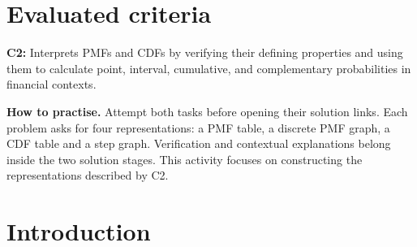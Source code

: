 \newcommand{\cTwoConnectionReading}{%
\textbf{How to read the stacked graphs.} The top graph shows the CDF and pale
dashed PMF shadows; the bottom graph shows the original blue PMF stems.
The plotting areas have identical horizontal limits, support ticks, numerical
spacing, widths and vertical scales. Stems show isolated masses, not positive
probability at every point along a segment. Each shadow represents a jump size:
it translates the mass vertically from $0$ to $\cTwoCDFHL{F_X(a^-)}$, keeping
its horizontal coordinate and physical length. Its top is $\cTwoCDFHL{F_X(a)}$, so
$\cTwoCDFHL{F_X(a)}-\cTwoCDFHL{F_X(a^-)}=\cTwoMassHL{p_X(a)}$.
Thin upward, parabolically curved arrows show correspondence from each bottom stem's midpoint
$(a,p_X(a)/2)$ to its top shadow's midpoint $(a,F_X(a^-)+p_X(a)/2)$,
including the smallest support value, where $F_X(a^-)=0$.
Their curved paths indicate correspondence, not additional probability values.
Shadows are neither extra masses nor extra CDF values at the cutoff.
CDF filled points give the included values; open points exclude the lower
heights. Pale shadow top dots sit behind the CDF endpoint markers.}


\maketitle
\section*{Evaluated criteria}
\textbf{C2:} Interprets PMFs and CDFs by verifying their defining properties and using them to calculate point, interval, cumulative, and complementary probabilities in financial contexts.

\textbf{How to practise.} Attempt both tasks before opening their solution links. Each problem asks for four representations: a PMF table, a discrete PMF graph, a CDF table and a step graph. Verification and contextual explanations belong inside the two solution stages. This activity focuses on constructing the representations described by C2.
\setcounter{tocdepth}{1}\setcounter{secnumdepth}{2}
\label{toc}\tableofcontents

\section{Introduction}\label{sec:intro}
